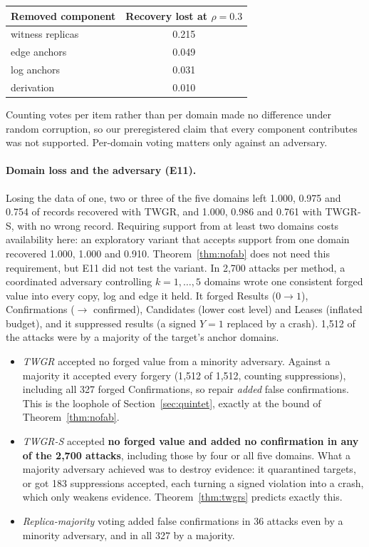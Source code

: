 \documentclass[11pt]{article}
\theoremstyle{definition}
\begin{document}
\begin{center}\small
\begin{tabular}{lc}
\toprule
Removed component & Recovery lost at $\rho=0.3$ \\\midrule
witness replicas & 0.215 \\
edge anchors & 0.049 \\
log anchors & 0.031 \\
derivation & 0.010 \\
\bottomrule
\end{tabular}
\end{center}

Counting votes per item rather than per domain made no difference under random corruption, so our preregistered claim that every component contributes was not supported. Per-domain voting matters only against an adversary.

\paragraph{Domain loss and the adversary (E11).} Losing the data of one, two or three of the five domains left 1.000, 0.975 and 0.754 of records recovered with TWGR, and 1.000, 0.986 and 0.761 with TWGR-S, with no wrong record. Requiring support from at least two domains costs availability here: an exploratory variant that accepts support from one domain recovered 1.000, 1.000 and 0.910. Theorem~\ref{thm:nofab} does not need this requirement, but E11 did not test the variant. In 2{,}700 attacks per method, a coordinated adversary controlling $k=1,\dots,5$ domains wrote one consistent forged value into every copy, log and edge it held. It forged Results ($0\to1$), Confirmations ($\to$ confirmed), Candidates (lower cost level) and Leases (inflated budget), and it suppressed results (a signed $Y=1$ replaced by a crash). 1{,}512 of the attacks were by a majority of the target's anchor domains.
\begin{itemize}
\item \emph{TWGR} accepted no forged value from a minority adversary. Against a majority it accepted every forgery (1{,}512 of 1{,}512, counting suppressions), including all 327 forged Confirmations, so repair \emph{added} false confirmations. This is the loophole of Section~\ref{sec:quintet}, exactly at the bound of Theorem~\ref{thm:nofab}.
\item \emph{TWGR-S} accepted \textbf{no forged value and added no confirmation in any of the 2{,}700 attacks}, including those by four or all five domains. What a majority adversary achieved was to destroy evidence: it quarantined targets, or got 183 suppressions accepted, each turning a signed violation into a crash, which only weakens evidence. Theorem~\ref{thm:twgrs} predicts exactly this.
\item \emph{Replica-majority} voting added false confirmations in 36 attacks even by a minority adversary, and in all 327 by a majority.
\end{itemize}
\end{document}
